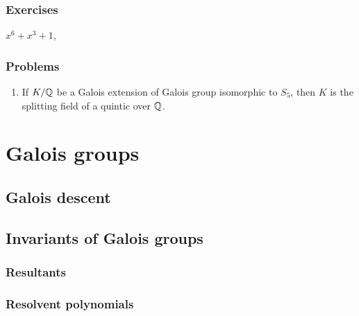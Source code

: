 \documentclass{../../large}
\begin{document}
\section*{Exercises}

$x^6+x^3+1$,



\section*{Problems}

\begin{enumerate}
\item If $K/\mathbb{Q}$ be a Galois extension of Galois group isomorphic to $S_5$, then $K$ is the splitting field of a quintic over $\mathbb{Q}$.
\end{enumerate}








\part{Galois groups}


\chapter{Galois descent}




\chapter{Invariants of Galois groups}

\section{Resultants}

\section{Resolvent polynomials}

\begin{prb}
\end{prb}
\begin{prb}
\end{prb}
\begin{prb}
\end{prb}
\begin{prb}
\end{prb}
\begin{prb}
\end{prb}
\end{document}
